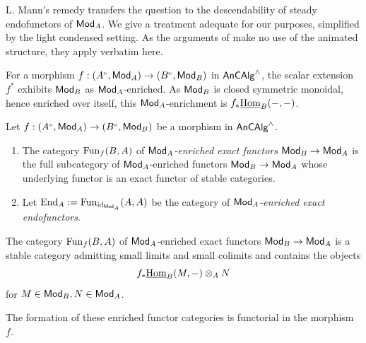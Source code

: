 L. Mann's remedy transfers the question to the descendability of steady endofunctors of $\mathsf{Mod}_{A}$. We give a treatment adequate for our purposes, simplified by the light condensed setting. As the arguments of \cite[\S 2.5]{MannRigid6FF} make no use of the animated structure, they apply verbatim here.

For a morphism $f:(A^{\tri},\Mod_{A})\to(B^{\tri},\Mod_{B})$ in $\mathsf{An}\mathsf{CAlg}^{\wedge}$, the scalar extension $f^{*}$ exhibits $\mathsf{Mod}_{B}$ as $\mathsf{Mod}_{A}$-enriched. As $\mathsf{Mod}_{B}$ is closed symmetric monoidal, hence enriched over itself, this $\mathsf{Mod}_{A}$-enrichment is $f_{*}\underline{\mathrm{Hom}}_{B}(-,-)$.
\begin{definition}\label{def: enriched endofunctors}
    Let $f:(A^{\tri},\Mod_{A})\to(B^{\tri},\Mod_{B})$ be a morphism in $\mathsf{An}\mathsf{CAlg}^{\wedge}$. 
    \begin{enumerate}
        \item The category $\mathrm{Fun}_{f}(B,A)$ of \emph{$\mathsf{Mod}_{A}$-enriched exact functors $\mathsf{Mod}_{B}\to\mathsf{Mod}_{A}$} is the full subcategory of $\mathsf{Mod}_{A}$-enriched functors $\mathsf{Mod}_{B}\to\mathsf{Mod}_{A}$ whose underlying functor is an exact functor of stable categories. 
        \item Let $\mathrm{End}_{A}:=\mathrm{Fun}_{\mathrm{id}_{\mathsf{Mod}_{A}}}(A,A)$ be the category of \emph{$\mathsf{Mod}_{A}$-enriched exact endofunctors}. 
    \end{enumerate}
\end{definition}
\begin{remark}\label{rmk: enriched endofunctors}
    The category $\mathrm{Fun}_{f}(B, A)$ of $\mathsf{Mod}_{A}$-enriched exact functors $\mathsf{Mod}_{B}\to\mathsf{Mod}_{A}$ is a stable category admitting small limits and small colimits and contains the objects 
    $$f_{*}\underline{\mathrm{Hom}}_{B}(M, -)\otimes_{A}N$$ 
    for $M\in\mathsf{Mod}_{B},N\in\mathsf{Mod}_{A}$. 
\end{remark}
The formation of these enriched functor categories is functorial in the morphism $f$. 
